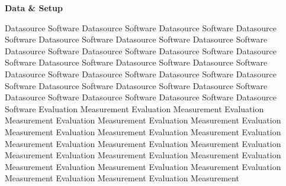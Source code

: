 \begin{center} \textbf{\huge Data \& Setup} \end{center}
Datasource Software Datasource Software  Datasource Software Datasource Software Datasource Software Datasource Software Datasource Software Datasource Software Datasource Software Datasource Software Datasource Software Datasource Software Datasource Software Datasource Software Datasource Software Datasource Software Datasource Software Datasource Software Datasource Software Datasource Software Datasource Software Datasource Software Datasource Software Datasource Software Datasource Software Evaluation Measurement Evaluation Measurement Evaluation Measurement Evaluation Measurement Evaluation Measurement Evaluation Measurement Evaluation Measurement Evaluation Measurement Evaluation Measurement Evaluation Measurement Evaluation Measurement Evaluation Measurement Evaluation Measurement Evaluation Measurement Evaluation Measurement Evaluation Measurement Evaluation Measurement Evaluation Measurement Evaluation Measurement Evaluation Measurement 

